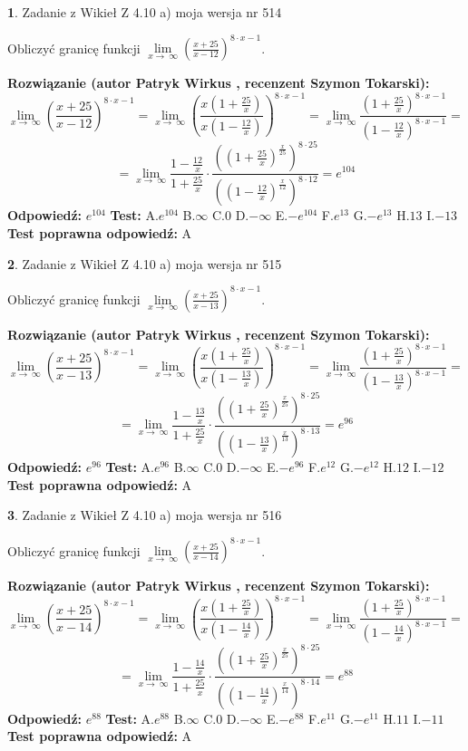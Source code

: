 \documentclass[12pt, a4paper]{article}
\theoremstyle{definition} %
\newtheorem{zad}{}
\newcommand{\zadStart}[1]{\begin{zad}#1\newline}
\newcommand{\zadStop}{\end{zad}}
\newcommand{\rozwStart}[2]{\noindent \textbf{Rozwiązanie (autor #1 , recenzent #2): }\newline}
\newcommand{\rozwStop}{\newline}
\newcommand{\odpStart}{\noindent \textbf{Odpowiedź:}\newline}
\newcommand{\odpStop}{\newline}
\newcommand{\testStart}{\noindent \textbf{Test:}\newline}
\newcommand{\testStop}{\newline}
\newcommand{\kluczStart}{\noindent \textbf{Test poprawna odpowiedź:}\newline}
\newcommand{\kluczStop}{\newline}
\begin{document}
\zadStart{Zadanie z Wikieł Z 4.10 a) moja wersja nr 514}

Obliczyć granicę funkcji  $\lim\limits_{x\to\ \infty}(\frac{x+25}{x-12})^{8\cdot x-1}$.
\zadStop
\rozwStart{Patryk Wirkus}{Szymon Tokarski}
$$\lim\limits_{x\to\ \infty}(\frac{x+25}{x-12})^{8\cdot x-1} = \lim\limits_{x\to\ \infty}(\frac{x(1+\frac{25}{x})}{x(1-\frac{12}{x})})^{8\cdot x-1}=\lim\limits_{x\to\ \infty}\frac{(1+\frac{25}{x})^{8\cdot x-1}}{(1-\frac{12}{x})^{8\cdot x-1}}=$$
$$=\lim\limits_{x\to\ \infty}\frac{1-\frac{12}{x}}{1+\frac{25}{x}}\cdot\frac{((1+\frac{25}{x})^{\frac{x}{25}})^{8\cdot25}}{((1-\frac{12}{x})^{\frac{x}{12}})^{8\cdot12}}=e^{104}$$
\rozwStop
\odpStart
$e^{104}$
\odpStop
\testStart
A.$e^{104}$ B.$\infty$ C.$0$ D.$-\infty$ E.$-e^{104}$
F.$e^{13}$ G.$-e^{13}$
H.$13$
I.$-13$
\testStop
\kluczStart
A
\kluczStop



\zadStart{Zadanie z Wikieł Z 4.10 a) moja wersja nr 515}

Obliczyć granicę funkcji  $\lim\limits_{x\to\ \infty}(\frac{x+25}{x-13})^{8\cdot x-1}$.
\zadStop
\rozwStart{Patryk Wirkus}{Szymon Tokarski}
$$\lim\limits_{x\to\ \infty}(\frac{x+25}{x-13})^{8\cdot x-1} = \lim\limits_{x\to\ \infty}(\frac{x(1+\frac{25}{x})}{x(1-\frac{13}{x})})^{8\cdot x-1}=\lim\limits_{x\to\ \infty}\frac{(1+\frac{25}{x})^{8\cdot x-1}}{(1-\frac{13}{x})^{8\cdot x-1}}=$$
$$=\lim\limits_{x\to\ \infty}\frac{1-\frac{13}{x}}{1+\frac{25}{x}}\cdot\frac{((1+\frac{25}{x})^{\frac{x}{25}})^{8\cdot25}}{((1-\frac{13}{x})^{\frac{x}{13}})^{8\cdot13}}=e^{96}$$
\rozwStop
\odpStart
$e^{96}$
\odpStop
\testStart
A.$e^{96}$ B.$\infty$ C.$0$ D.$-\infty$ E.$-e^{96}$
F.$e^{12}$ G.$-e^{12}$
H.$12$
I.$-12$
\testStop
\kluczStart
A
\kluczStop



\zadStart{Zadanie z Wikieł Z 4.10 a) moja wersja nr 516}

Obliczyć granicę funkcji  $\lim\limits_{x\to\ \infty}(\frac{x+25}{x-14})^{8\cdot x-1}$.
\zadStop
\rozwStart{Patryk Wirkus}{Szymon Tokarski}
$$\lim\limits_{x\to\ \infty}(\frac{x+25}{x-14})^{8\cdot x-1} = \lim\limits_{x\to\ \infty}(\frac{x(1+\frac{25}{x})}{x(1-\frac{14}{x})})^{8\cdot x-1}=\lim\limits_{x\to\ \infty}\frac{(1+\frac{25}{x})^{8\cdot x-1}}{(1-\frac{14}{x})^{8\cdot x-1}}=$$
$$=\lim\limits_{x\to\ \infty}\frac{1-\frac{14}{x}}{1+\frac{25}{x}}\cdot\frac{((1+\frac{25}{x})^{\frac{x}{25}})^{8\cdot25}}{((1-\frac{14}{x})^{\frac{x}{14}})^{8\cdot14}}=e^{88}$$
\rozwStop
\odpStart
$e^{88}$
\odpStop
\testStart
A.$e^{88}$ B.$\infty$ C.$0$ D.$-\infty$ E.$-e^{88}$
F.$e^{11}$ G.$-e^{11}$
H.$11$
I.$-11$
\testStop
\kluczStart
A
\kluczStop
\end{document}
